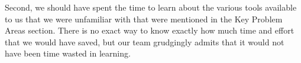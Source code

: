 \documentclass{article}
\begin{document}
Second, we should have spent the time to learn about the various tools available to us that we were unfamiliar with that were mentioned in the Key Problem Areas section. There is no exact way to know exactly how much time and effort that we would have saved, but our team grudgingly admits that it would not have been time wasted in learning.\\ 
\end{document}

